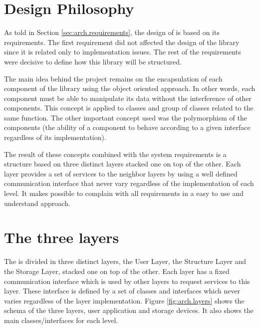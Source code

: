 \section{Design Philosophy}
\label{sec:arch.philosophy}

As told in Section \ref{sec:arch.requirements}, the design of \libname{ } is based on its requirements. The first requirement did not affected the design of the library since it is related only to implementation issues. The rest of the requirements were decisive to define how this library will be structured.

The main idea behind the project remains on the encapsulation of each component of the library using the object oriented approach. In other words, each component must be able to manipulate its data without the interference of other components. This concept is applied to classes and group of classes related to the same function. The other important concept used was the polymorphism of the components (the ability of a component to behave according to a given interface regardless of its implementation).

The result of these concepts combined with the system requirements is a structure based on three distinct layers stacked one on top of the other. Each layer provides a set of services to the neighbor layers by using a well defined communication interface that never vary regardless of the implementation of each level. It makes possible to complain with all requirements in a easy to use and understand approach.

\section{The three layers}
\label{sec:arch.layers}

The \libname{ }is divided in three distinct layers, the User Layer, the Structure Layer and the Storage Layer, stacked one on top of the other. Each layer has a fixed communication interface which is used by other layers to request services to this layer. These interface is defined by a set of classes and interfaces which never varies regardless of the layer implementation. Figure \ref{fig:arch.layers} shows the schema of the three layers, user application and storage devices. It also shows the main classes/interfaces for each level.

